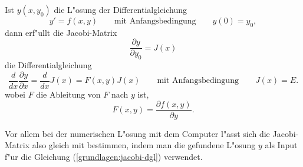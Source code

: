 \begin{satz}
Ist $y(x,y_0)$ die L"osung der Differentialgleichung 
\[
y'=f(x,y)\qquad\text{mit Anfangsbedingung}\qquad y(0)=y_0,
\]
dann erf"ullt die Jacobi-Matrix 
\[
\frac{\partial y}{\partial y_0}=J(x)
\]
die Differentialgleichung
\begin{equation}
\frac{d}{dx}\frac{\partial y}{\partial x}
=
\frac{d}{dx}J(x)
=
F(x,y)J(x)
\qquad
\text{mit Anfangsbedingung}
\qquad
J(x)=E.
\label{grundlagen:jacobi-dgl}
\end{equation}
wobei $F$ die Ableitung von $F$ nach $y$ ist,
\[
F(x,y)=\frac{\partial f(x,y)}{\partial y}.
\]
\end{satz}
Vor allem bei der numerischen L"osung mit dem Computer l"asst sich
die Jacobi-Matrix also gleich mit bestimmen, indem man die gefundene
L"osung $y$ als Input f"ur die Gleichung (\ref{grundlagen:jacobi-dgl})
verwendet.


